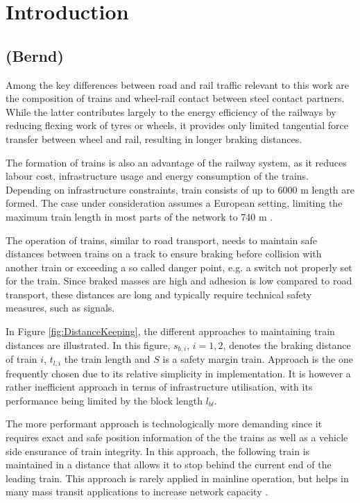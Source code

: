 \documentclass[a4paper, 12pt]{scrartcl}
\begin{document}
\section{Introduction}
\subsection{ (Bernd)}
Among the key differences between road and rail traffic relevant to this work are the composition of trains and wheel-rail contact between steel contact partners. While the latter contributes largely to the energy efficiency of the railways by reducing flexing work of tyres or wheels, it provides only limited tangential force transfer between wheel and rail, resulting in longer braking distances. 

The formation of trains is also an advantage of the railway system, as it reduces labour cost, infrastructure usage and energy consumption of the trains. Depending on infrastructure constraints, train consists of up to 6000 m length are formed. The case under consideration assumes a European setting, limiting the maximum train length in most parts of the network to 740 m \cite{tsiinf}.

The operation of trains, similar to road transport, needs to maintain safe distances between trains on a track to ensure braking before collision with another train or exceeding a so called danger point, e.g. a switch not properly set for the train. Since braked masses are high and adhesion is low compared to road transport, these distances are long and typically require technical safety measures, such as signals.

In Figure \ref{fig:DistanceKeeping}, the different approaches to maintaining train distances are illustrated. In this figure, $s_{b,i}$, $i = 1,2$, denotes the braking distance of train $i$, $t_{l, i}$ the train length and $S$ is a safety margin train. Approach  is the one frequently chosen due to its relative simplicity in implementation. It is however a rather inefficient approach in terms of infrastructure utilisation, with its performance being limited by the block length $l_{bl}$. 

The more performant approach  is technologically more demanding since it requires exact and safe position information of the the trains as well as a vehicle side ensurance of train integrity. In this approach, the following train is maintained in a distance that allows it to stop behind the current end of the leading train. This approach is rarely applied in mainline operation, but helps in many mass transit applications to increase network capacity \cite{pachl2011systemtechnik}. 
\end{document}
